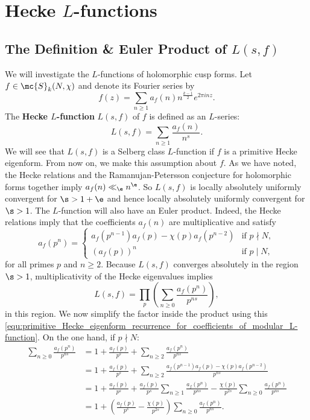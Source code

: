   \section{Hecke \texorpdfstring{$L$}{L}-functions}
    \subsection*{The Definition \& Euler Product of \texorpdfstring{$L(s,f)$}{L(s,f)}}
      We will investigate the $L$-functions of holomorphic cusp forms. Let $f \in \mc{S}_{k}(N,\chi)$ and denote its Fourier series by
      \[
        f(z) = \sum_{n \ge 1}a_{f}(n)n^{\frac{k-1}{2}}e^{2\pi inz}.
      \]
      The \textbf{Hecke $L$-function} $L(s,f)$ of $f$ is defined as an $L$-series:
      \[
        L(s,f) = \sum_{n \ge 1}\frac{a_{f}(n)}{n^{s}}.
      \]
      We will see that $L(s,f)$ is a Selberg class $L$-function if $f$ is a primitive Hecke eigenform. From now on, we make this assumption about $f$. As we have noted, the Hecke relations and the Ramanujan-Petersson conjecture for holomorphic forms together imply $a_{f}(n) \ll_{\e} n^{\e}$. So $L(s,f)$ is locally absolutely uniformly convergent for $\s > 1+\e$ and hence locally absolutely uniformly convergent for $\s > 1$. The $L$-function will also have an Euler product. Indeed, the Hecke relations imply that the coefficients $a_{f}(n)$ are multiplicative and satisfy
      \begin{equation}\label{equ:primitive_Hecke_eigenform_recurrence_for_coefficients_of_modular_L-function}
        a_{f}(p^{n}) = \begin{cases} a_{f}(p^{n-1})a_{f}(p)-\chi(p)a_{f}(p^{n-2}) & \text{if $p \nmid N$}, \\ (a_{f}(p))^{n} & \text{if $p \mid N$}, \end{cases}
      \end{equation}
      for all primes $p$ and $n \ge 2$. Because $L(s,f)$ converges absolutely in the region $\s > 1$, multiplicativity of the Hecke eigenvalues implies
      \[
        L(s,f) = \prod_{p}\left(\sum_{n \ge 0}\frac{a_{f}(p^{n})}{p^{ns}}\right),
      \]
      in this region. We now simplify the factor inside the product using this \cref{equ:primitive_Hecke_eigenform_recurrence_for_coefficients_of_modular_L-function}. On the one hand, if $p \nmid N$:
      \begin{align*}
        \sum_{n \ge 0}\frac{a_{f}(p^{n})}{p^{ns}} &= 1+\frac{a_{f}(p)}{p^{s}}+\sum_{n \ge 2}\frac{a_{f}(p^{n})}{p^{ns}} \\
        &= 1+\frac{a_{f}(p)}{p^{s}}+\sum_{n \ge 2}\frac{a_{f}(p^{n-1})a_{f}(p)-\chi(p)a_{f}(p^{n-2})}{p^{ns}} \\
        &= 1+\frac{a_{f}(p)}{p^{s}}+\frac{a_{f}(p)}{p^{s}}\sum_{n \ge 1}\frac{a_{f}(p^{n})}{p^{ns}}-\frac{\chi(p)}{p^{2s}}\sum_{n \ge 0}\frac{a_{f}(p^{n})}{p^{ns}} \\
        &= 1+\left(\frac{a_{f}(p)}{p^{s}}-\frac{\chi(p)}{p^{2s}}\right)\sum_{n \ge 0}\frac{a_{f}(p^{n})}{p^{ns}}.
      \end{align*}
